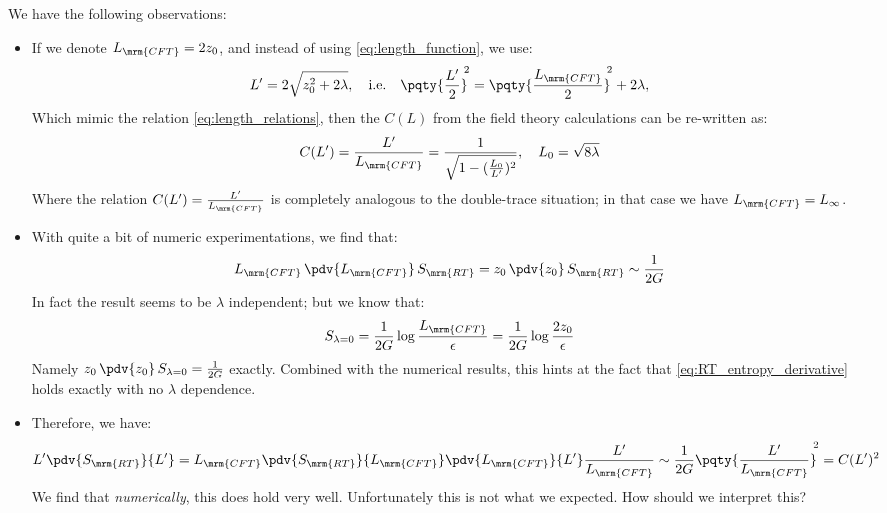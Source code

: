 \documentclass[a4paper
	,10pt
]{article}
\begin{document}
	We have the following observations: 
	\begin{itemize}
	\item If we denote $L_{\mrm{CFT}} = 2z_0$, and instead of using \eqref{eq:length_function}, we use:
	\begin{equation}
		L' = 2\sqrt{z_0^2 + 2\lambda},
	\quad\text{i.e.}\quad
		\pqty{\frac{L'}{2}}^{\!\!2}
		= \pqty{\frac{L_\mrm{CFT}}{2}}^{\!\!2} + 2\lambda,
	\end{equation}
	Which mimic the relation \eqref{eq:length_relations}, then the $C(L)$ from the field theory calculations can be re-written as:
	\begin{equation}
		C(L')
		= \frac{L'}{L_{\mrm{CFT}}}
		= \frac{1}{\sqrt{1 - (\frac{L_0}{L'})^2}},
	\quad L_0 = \sqrt{8\lambda}
	\end{equation}
	Where the relation $C(L') = \frac{L'}{L_{\mrm{CFT}}}$ is completely analogous to the double-trace situation; in that case we have $L_\mrm{CFT} = L_\infty$. 
	
	\item With quite a bit of numeric experimentations, we find that:
	\begin{equation}
		L_\mrm{CFT}\,\pdv{L_\mrm{CFT}}\,S_\mrm{RT}
		= z_0\,\pdv{z_0}\,S_\mrm{RT}
		\sim \frac{1}{2G}
	\label{eq:RT_entropy_derivative}
	\end{equation}
	In fact the result seems to be $\lambda$ independent; but we know that:
	\begin{equation}
		S_{\lambda = 0}
		= \frac{1}{2G}
			\log \frac{L_\mrm{CFT}}{\epsilon}
		= \frac{1}{2G}
			\log \frac{2z_0}{\epsilon}
	\end{equation}
	Namely $
		z_0\,\pdv{z_0}\,S_{\lambda = 0}
		= \frac{1}{2G}
	$ exactly. Combined with the numerical results, this hints at the fact that \eqref{eq:RT_entropy_derivative} holds exactly with no $\lambda$ dependence. 
	
	\item Therefore, we have:
	\begin{equation}
		L' \pdv{S_\mrm{RT}}{L'}
		= L_\mrm{CFT} \pdv{S_\mrm{RT}}{L_\mrm{CFT}}
			\pdv{L_\mrm{CFT}}{L'}
			\frac{L'}{L_\mrm{CFT}}
		\sim \frac{1}{2G}
			\pqty{\frac{L'}{L_\mrm{CFT}}}^{\!\!2}
		= C(L')^2
	\end{equation}
	We find that \textit{numerically}, this does hold very well. Unfortunately this is not what we expected. How should we interpret this?
	\end{itemize}
	
\end{document}
